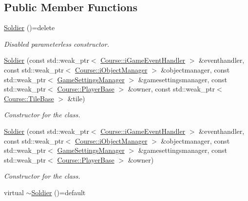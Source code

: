 \subsection*{Public Member Functions}
\begin{DoxyCompactItemize}
\item 
\hypertarget{class_student_1_1_soldier_a36c4812142d4bbcc2966f4eb787b1fe2}{\hyperlink{class_student_1_1_soldier_a36c4812142d4bbcc2966f4eb787b1fe2}{Soldier} ()=delete}\label{class_student_1_1_soldier_a36c4812142d4bbcc2966f4eb787b1fe2}

\begin{DoxyCompactList}\small\item\em Disabled parameterless constructor. \end{DoxyCompactList}\item 
\hyperlink{class_student_1_1_soldier_a405d2e15a80dddf87b3878ded7e77f34}{Soldier} (const std\-::weak\-\_\-ptr$<$ \hyperlink{class_course_1_1i_game_event_handler}{Course\-::i\-Game\-Event\-Handler} $>$ \&eventhandler, const std\-::weak\-\_\-ptr$<$ \hyperlink{class_course_1_1i_object_manager}{Course\-::i\-Object\-Manager} $>$ \&objectmanager, const std\-::weak\-\_\-ptr$<$ \hyperlink{class_student_1_1_game_settings_manager}{Game\-Settings\-Manager} $>$ \&gamesettingsmanager, const std\-::weak\-\_\-ptr$<$ \hyperlink{class_course_1_1_player_base}{Course\-::\-Player\-Base} $>$ \&owner, const std\-::weak\-\_\-ptr$<$ \hyperlink{class_course_1_1_tile_base}{Course\-::\-Tile\-Base} $>$ \&tile)
\begin{DoxyCompactList}\small\item\em Constructor for the class. \end{DoxyCompactList}\item 
\hyperlink{class_student_1_1_soldier_a3f998ab0a358af35fad4bdbe5f3ab886}{Soldier} (const std\-::weak\-\_\-ptr$<$ \hyperlink{class_course_1_1i_game_event_handler}{Course\-::i\-Game\-Event\-Handler} $>$ \&eventhandler, const std\-::weak\-\_\-ptr$<$ \hyperlink{class_course_1_1i_object_manager}{Course\-::i\-Object\-Manager} $>$ \&objectmanager, const std\-::weak\-\_\-ptr$<$ \hyperlink{class_student_1_1_game_settings_manager}{Game\-Settings\-Manager} $>$ \&gamesettingsmanager, const std\-::weak\-\_\-ptr$<$ \hyperlink{class_course_1_1_player_base}{Course\-::\-Player\-Base} $>$ \&owner)
\begin{DoxyCompactList}\small\item\em Constructor for the class. \end{DoxyCompactList}\item 
\hypertarget{class_student_1_1_soldier_ae308b7d4fb285f3fd77d5b3764e2c7a9}{virtual \hyperlink{class_student_1_1_soldier_ae308b7d4fb285f3fd77d5b3764e2c7a9}{$\sim$\-Soldier} ()=default}\label{class_student_1_1_soldier_ae308b7d4fb285f3fd77d5b3764e2c7a9}


\end{DoxyCompactItemize}
